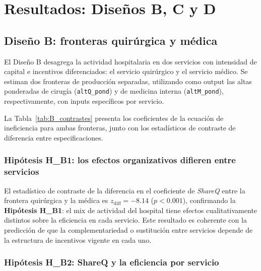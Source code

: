 
\section{Resultados: Diseños B, C y D}
\label{sec:resultados_BCD}

\subsection{Diseño B: fronteras quirúrgica y médica}
\label{subsec:B}

El Diseño B desagrega la actividad hospitalaria en dos servicios con intensidad de capital e incentivos diferenciados: el servicio quirúrgico y el servicio médico. Se estiman dos fronteras de producción separadas, utilizando como output las altas ponderadas de cirugía (\texttt{altQ\_pond}) y de medicina interna (\texttt{altM\_pond}), respectivamente, con inputs específicos por servicio.

La Tabla~\ref{tab:B_contrastes} presenta los coeficientes de la ecuación de ineficiencia para ambas fronteras, junto con los estadísticos de contraste de diferencia entre especificaciones.

\begin{table}[htbp]
\centering
\caption{Diseño B: coeficientes de ineficiencia — contrastes Q vs M}
\label{tab:B_contrastes}
\small

\end{table}

\subsubsection{Hipótesis H\_B1: los efectos organizativos difieren entre servicios}

El estadístico de contraste de la diferencia en el coeficiente de \textit{ShareQ} entre la frontera quirúrgica y la médica es $z_{\text{diff}} = -8.14$ ($p < 0.001$), confirmando la \textbf{Hipótesis H\_B1}: el mix de actividad del hospital tiene efectos cualitativamente distintos sobre la eficiencia en cada servicio. Este resultado es coherente con la predicción de que la complementariedad o sustitución entre servicios depende de la estructura de incentivos vigente en cada uno.

\subsubsection{Hipótesis H\_B2: ShareQ y la eficiencia por servicio}

